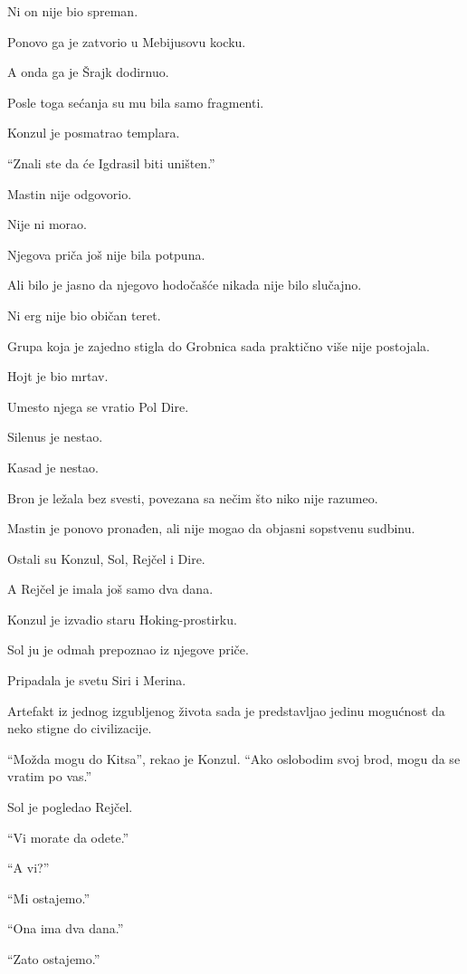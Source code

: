 Ni on nije bio spreman.

Ponovo ga je zatvorio u Mebijusovu kocku.

A onda ga je Šrajk dodirnuo.

Posle toga sećanja su mu bila samo fragmenti.

\bigskip

Konzul je posmatrao templara.

``Znali ste da će Igdrasil biti uništen.''

Mastin nije odgovorio.

Nije ni morao.

Njegova priča još nije bila potpuna.

Ali bilo je jasno da njegovo hodočašće nikada nije bilo slučajno.

Ni erg nije bio običan teret.

\bigskip

Grupa koja je zajedno stigla do Grobnica sada praktično više nije postojala.

Hojt je bio mrtav.

Umesto njega se vratio Pol Dire.

Silenus je nestao.

Kasad je nestao.

Bron je ležala bez svesti, povezana sa nečim što niko nije razumeo.

Mastin je ponovo pronađen, ali nije mogao da objasni sopstvenu sudbinu.

Ostali su Konzul, Sol, Rejčel i Dire.

A Rejčel je imala još samo dva dana.

\bigskip

Konzul je izvadio staru Hoking-prostirku.

Sol ju je odmah prepoznao iz njegove priče.

Pripadala je svetu Siri i Merina.

Artefakt iz jednog izgubljenog života sada je predstavljao jedinu mogućnost da neko stigne do civilizacije.

``Možda mogu do Kitsa'', rekao je Konzul. ``Ako oslobodim svoj brod, mogu da se vratim po vas.''

Sol je pogledao Rejčel.

``Vi morate da odete.''

``A vi?''

``Mi ostajemo.''

``Ona ima dva dana.''

``Zato ostajemo.''

